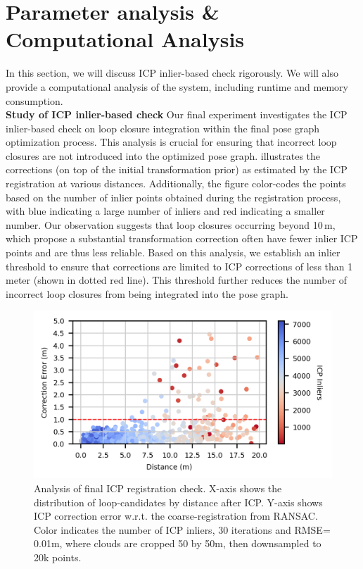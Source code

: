 \section{Parameter analysis \& Computational Analysis}
In this section, we will discuss ICP inlier-based check rigorously. We will also provide a computational analysis of the system, including runtime and memory consumption.\\
\newline
\textbf{Study of ICP inlier-based check}\hspace{0.5em} Our final experiment investigates the ICP inlier-based check on loop closure integration within the final pose graph optimization process. This analysis is crucial for ensuring that incorrect loop closures are not introduced into the optimized pose graph.
 illustrates the corrections (on top of the initial transformation prior) as estimated by the ICP registration at various distances. Additionally, the figure color-codes the points based on the number of inlier points obtained during the registration process, with blue indicating a large number of inliers and red indicating a smaller number.
Our observation suggests that loop closures occurring beyond 10\,m, which propose a substantial transformation correction often have fewer inlier ICP points and are thus less reliable.
Based on this analysis, we establish an inlier threshold to ensure that corrections are limited to ICP corrections of less than 1 meter (shown in dotted red line). This threshold further reduces the number of incorrect loop closures from being integrated into the pose graph.\\
\begin{figure}[t]
  \centering
  \includegraphics[width=0.99\linewidth]{pics/exp_4_ablation_icp_inliers_4cm}
  \caption{Analysis of final ICP registration check. X-axis shows the distribution of loop-candidates by distance after ICP.
  Y-axis shows ICP correction error w.r.t. the coarse-registration from RANSAC. Color indicates the number of ICP inliers,  30 iterations and RMSE= 0.01m, where clouds are cropped 50 by 50m, then downsampled to 20k points.}
  \label{fig:icp_inliers}
\end{figure}
